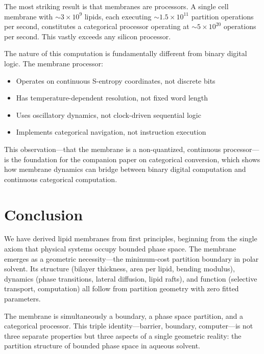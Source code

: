 \documentclass[twocolumn,10pt]{article}
\theoremstyle{remark}
\begin{document}
The most striking result is that membranes are processors. A single cell membrane with $\sim 3 \times 10^9$ lipids, each executing $\sim 1.5 \times 10^{11}$ partition operations per second, constitutes a categorical processor operating at $\sim 5 \times 10^{20}$ operations per second. This vastly exceeds any silicon processor.

The nature of this computation is fundamentally different from binary digital logic. The membrane processor:
\begin{itemize}
    \item Operates on continuous S-entropy coordinates, not discrete bits
    \item Has temperature-dependent resolution, not fixed word length
    \item Uses oscillatory dynamics, not clock-driven sequential logic
    \item Implements categorical navigation, not instruction execution
\end{itemize}

This observation---that the membrane is a non-quantized, continuous processor---is the foundation for the companion paper on categorical conversion, which shows how membrane dynamics can bridge between binary digital computation and continuous categorical computation.

\section{Conclusion}

We have derived lipid membranes from first principles, beginning from the single axiom that physical systems occupy bounded phase space. The membrane emerges as a geometric necessity---the minimum-cost partition boundary in polar solvent. Its structure (bilayer thickness, area per lipid, bending modulus), dynamics (phase transitions, lateral diffusion, lipid rafts), and function (selective transport, computation) all follow from partition geometry with zero fitted parameters.

The membrane is simultaneously a boundary, a phase space partition, and a categorical processor. This triple identity---barrier, boundary, computer---is not three separate properties but three aspects of a single geometric reality: the partition structure of bounded phase space in aqueous solvent.



\end{document}
